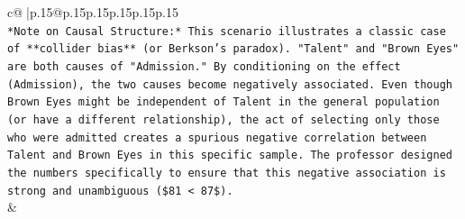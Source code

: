\documentclass{article}
\begin{document}
{\begin{supertabular}{c@{$\;$}|p{.15\linewidth}@{}p{.15\linewidth}p{.15\linewidth}p{.15\linewidth}p{.15\linewidth}p{.15\linewidth}}
{{{\\ 
\texttt{*Note on Causal Structure:* This scenario illustrates a classic case of **collider bias** (or Berkson's paradox). "Talent" and "Brown Eyes" are both causes of "Admission." By conditioning on the effect (Admission), the two causes become negatively associated. Even though Brown Eyes might be independent of Talent in the general population (or have a different relationship), the act of selecting only those who were admitted creates a spurious negative correlation between Talent and Brown Eyes in this specific sample. The professor designed the numbers specifically to ensure that this negative association is strong and unambiguous (\$81 < 87\$).} \\
            }
        }
    }
    & \\ \\


\end{supertabular}}
\end{document}

